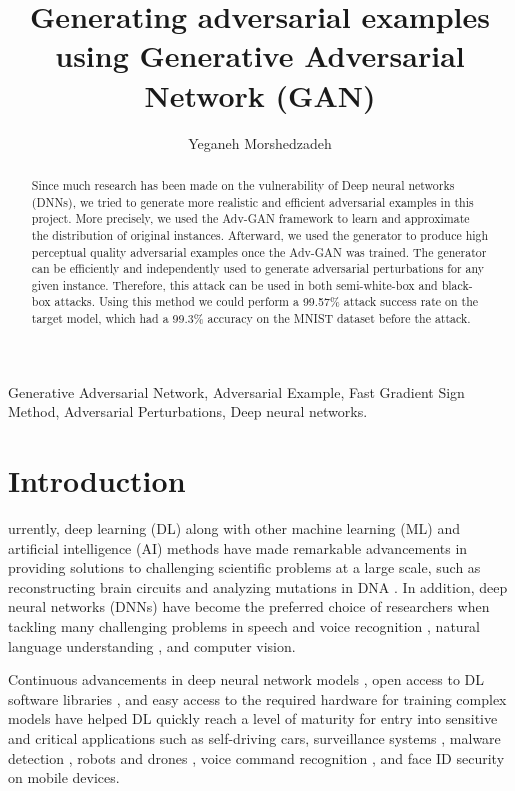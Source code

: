 \documentclass[lettersize,journal]{IEEEtran}
\begin{document}
\title{Generating adversarial examples using Generative Adversarial Network (GAN)}

\author{Yeganeh Morshedzadeh}

\maketitle

\begin{abstract}
Since much research has been made on the vulnerability of Deep neural networks (DNNs), we tried to generate more realistic and efficient adversarial examples in this project.	More precisely, we used the Adv-GAN framework to learn and approximate the distribution of original instances. Afterward, we used the generator to produce high perceptual quality adversarial examples once the Adv-GAN was trained. The generator can be efficiently and independently used to generate adversarial perturbations for any given instance. Therefore, this attack can be used in both semi-white-box and black-box attacks. Using this method we could perform a 99.57\% attack success rate on the target model, which had a 99.3\% accuracy on the MNIST dataset before the attack. 
\end{abstract}

\begin{IEEEkeywords}
Generative Adversarial Network, Adversarial Example, Fast Gradient Sign Method, Adversarial Perturbations, Deep neural networks.
\end{IEEEkeywords}

\section{Introduction}
urrently, deep learning (DL) along with other machine learning (ML) and artificial intelligence (AI) methods have made remarkable advancements in providing solutions to challenging scientific problems at a large scale, such as reconstructing brain circuits \cite{Helmstaedter2013ConnectomicRO} and analyzing mutations in DNA \cite{Xiong2015TheHS}. In addition, deep neural networks (DNNs) have become the preferred choice of researchers when tackling many challenging problems in speech and voice recognition \cite{Hinton2012DeepNN}, natural language understanding \cite{Sutskever2014SequenceTS}, and computer vision.

Continuous advancements in deep neural network models \cite{Szegedy2016RethinkingTI, He2016DeepRL}, open access to DL software libraries \cite{Vedaldi2015MatConvNetCN, Jia2014CaffeCA, Abadi2016TensorFlowLM}, and easy access to the required hardware for training complex models have helped DL quickly reach a level of maturity for entry into sensitive and critical applications such as self-driving cars, surveillance systems \cite{Najafabadi2014DeepLA}, malware detection \cite{Papernot2016TowardsTS, Grosse2017AdversarialEF}, robots and drones \cite{Mnih2015HumanlevelCT, Giusti2016AML}, voice command recognition \cite{Hinton2012DeepNN}, and face ID security on mobile devices.
\end{document}
